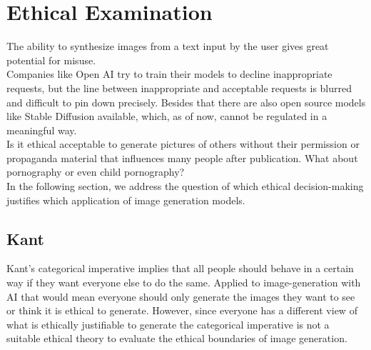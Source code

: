 \documentclass[9pt,twocolumn,twoside]{osajnl}
\begin{document}
\section{Ethical Examination}
The ability to synthesize images from a text input by the user gives great potential for misuse. \\
Companies like Open AI try to train their models to decline inappropriate requests, but the line between inappropriate and acceptable requests is blurred and difficult to pin down precisely. 
Besides that there are also open source models like Stable Diffusion \cite{StableDiffusion} available, which, as of now, cannot be regulated in a meaningful way. \\
Is it ethical acceptable to generate pictures of others without their permission or propaganda material that influences many people after publication. What about pornography or even child pornography?\\
In the following section, we address the question of which ethical decision-making justifies which application of image generation models.

\subsection{Kant}
Kant's categorical imperative implies that all people should behave in a certain way if they want everyone else to do the same.
Applied to image-generation with AI that would mean everyone should only generate the images they want to see or think it is ethical to generate.
However, since everyone has a different view of what is ethically justifiable to generate the categorical imperative is not a suitable ethical theory to evaluate the ethical boundaries of image generation.
\end{document}

